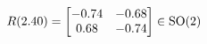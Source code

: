 \documentclass[preview]{standalone}
\begin{document}
\begin{align*}
\special{dvisvgm:raw <g id='unique000'>}R(2.40) = \begin{bmatrix} -0.74 & -0.68 \\ 0.68 & -0.74 \end{bmatrix} \in \text{SO}(2)\special{dvisvgm:raw </g>}
\end{align*}
\end{document}
